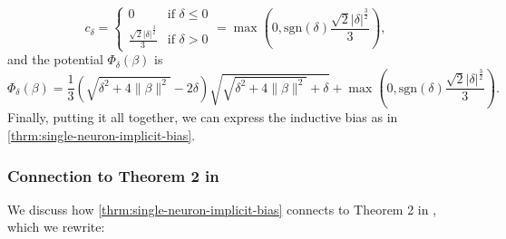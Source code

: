 \documentclass{article}
\theoremstyle{plain}
\newtheorem{theorem}{Theorem}[section]
\theoremstyle{definition}
\theoremstyle{remark}
\DeclareMathOperator*{\argmin}{arg\,min}
\begin{document}
\begin{equation}
    c_\delta = 
    \begin{cases}
        0 & \text{if } \delta \le 0\\
        \frac{\sqrt{2}|\delta|^\frac{3}{2}}{3} & \text{if } \delta > 0
    \end{cases} = \max\left(0, \mathrm{sgn}(\delta)\frac{\sqrt{2}|\delta|^\frac{3}{2}}{3}\right),
\end{equation}
and the potential $\Phi_\delta(\beta)$ is 
\begin{equation}
    \Phi_\delta(\beta) = \frac{1}{3}\left(\sqrt{\delta^2 + 4\|\beta\|^2} - 2\delta\right)\sqrt{\sqrt{\delta^2 + 4\|\beta\|^2} + \delta} + \max\left(0, \mathrm{sgn}(\delta)\frac{\sqrt{2}|\delta|^\frac{3}{2}}{3}\right).
\end{equation}
Finally, putting it all together, we can express the inductive bias as in \cref{thrm:single-neuron-implicit-bias}.

\subsubsection{Connection to Theorem 2 in \texorpdfstring{\citet{azulay2021implicit}}{Azulay et al.}}

We discuss how \cref{thrm:single-neuron-implicit-bias} connects to Theorem 2 in \citet{azulay2021implicit}, which we rewrite:
\end{document}

